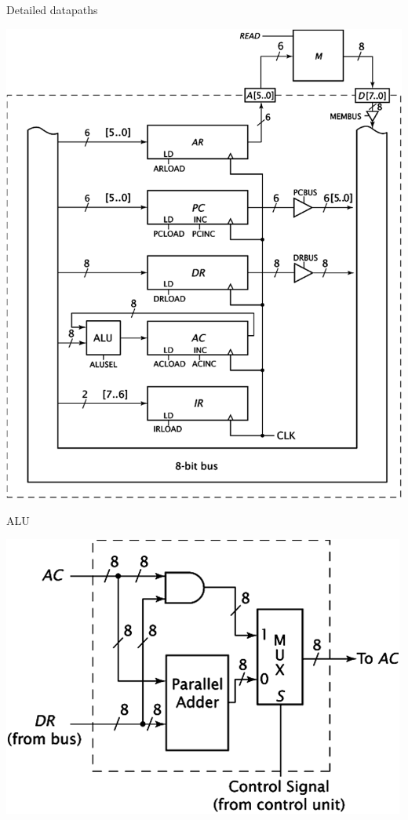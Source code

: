 \begin{frame}{Detailed datapaths}
  \begin{center}
    \includegraphics[scale=0.4]{AdvancedDataPaths}
  \end{center}
\end{frame}

\begin{frame}{ALU}
  \begin{center}
    \includegraphics[scale=0.4]{ALU}
  \end{center}
\end{frame}

